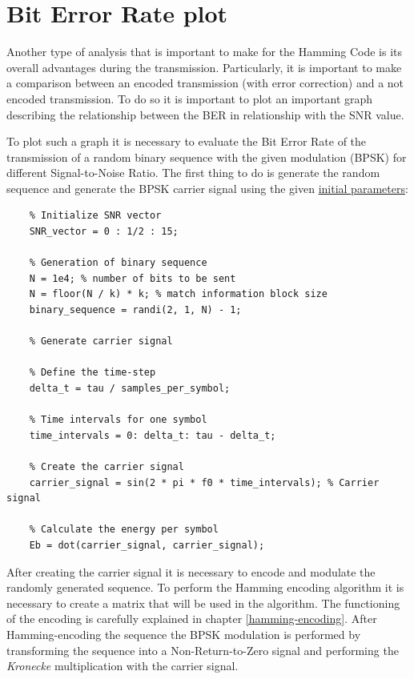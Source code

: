 \vspace{40px}\section{Bit Error Rate plot}
Another type of analysis that is important to make for the Hamming Code is its overall advantages during the transmission. Particularly, it is important to make a comparison between an encoded transmission (with error correction) and a not encoded transmission. To do so it is important to plot an important graph describing the relationship between the BER in relationship with the SNR value.

To plot such a graph it is necessary to evaluate the Bit Error Rate of the transmission of a random binary sequence with the given modulation (BPSK) for different Signal-to-Noise Ratio. The first thing to do is generate the random sequence and generate the BPSK carrier signal using the given \hyperref[initial-parameters]{initial parameters}:

\begin{lstlisting}
    % Initialize SNR vector
    SNR_vector = 0 : 1/2 : 15; 
        
    % Generation of binary sequence
    N = 1e4; % number of bits to be sent
    N = floor(N / k) * k; % match information block size
    binary_sequence = randi(2, 1, N) - 1;
    
    % Generate carrier signal
    
    % Define the time-step
    delta_t = tau / samples_per_symbol;
    
    % Time intervals for one symbol
    time_intervals = 0: delta_t: tau - delta_t;
    
    % Create the carrier signal
    carrier_signal = sin(2 * pi * f0 * time_intervals); % Carrier signal
    
    % Calculate the energy per symbol
    Eb = dot(carrier_signal, carrier_signal);
\end{lstlisting}

\noindent After creating the carrier signal it is necessary to encode and modulate the randomly generated sequence. To perform the Hamming encoding algorithm it is necessary to create a matrix that will be used in the algorithm. The functioning of the encoding is carefully explained in chapter \ref{hamming-encoding}. After Hamming-encoding the sequence the BPSK modulation is performed by transforming the sequence into a Non-Return-to-Zero signal and performing the \textit{Kronecke} multiplication with the carrier signal.

